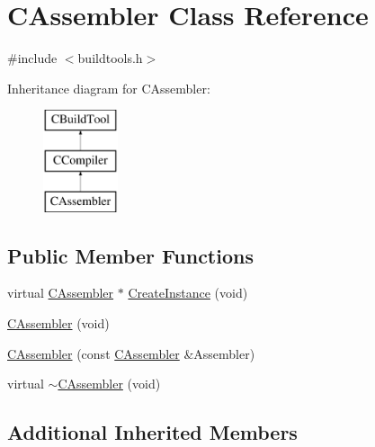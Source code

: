 \hypertarget{classCAssembler}{\section{C\-Assembler Class Reference}
\label{classCAssembler}
}


{\ttfamily \#include $<$buildtools.\-h$>$}

Inheritance diagram for C\-Assembler\-:\begin{figure}[H]
\begin{center}
\leavevmode
\includegraphics[height=3.000000cm]{d1/ddf/classCAssembler}
\end{center}
\end{figure}
\subsection*{Public Member Functions}
\begin{DoxyCompactItemize}
\item 
virtual \hyperlink{classCAssembler}{C\-Assembler} $\ast$ \hyperlink{classCAssembler_abc4ab373b93fc0980c204764afa73306}{Create\-Instance} (void)
\item 
\hyperlink{classCAssembler_a70fd8e0ff8470124a37474235a7e52bf}{C\-Assembler} (void)
\item 
\hyperlink{classCAssembler_a5e08b02af7a5bb5fbc35d3f1bbd9cca1}{C\-Assembler} (const \hyperlink{classCAssembler}{C\-Assembler} \&Assembler)
\item 
virtual \hyperlink{classCAssembler_a67f5ecec0343372cb4492e31f99aa313}{$\sim$\-C\-Assembler} (void)
\end{DoxyCompactItemize}
\subsection*{Additional Inherited Members}


